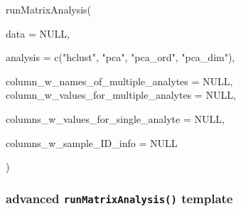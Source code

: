 \documentclass[
]{krantz}
\newenvironment{Shaded}{\begin{snugshade}}{\end{snugshade}}
\newcommand{\AttributeTok}[1]{\textcolor[rgb]{0.77,0.63,0.00}{#1}}
\newcommand{\ConstantTok}[1]{\textcolor[rgb]{0.00,0.00,0.00}{#1}}
\newcommand{\FunctionTok}[1]{\textcolor[rgb]{0.00,0.00,0.00}{#1}}
\newcommand{\NormalTok}[1]{#1}
\newcommand{\StringTok}[1]{\textcolor[rgb]{0.31,0.60,0.02}{#1}}
\begin{document}
\begin{Shaded}
\begin{Highlighting}[]

\FunctionTok{runMatrixAnalysis}\NormalTok{(}
                
  \AttributeTok{data =} \ConstantTok{NULL}\NormalTok{,}

  \AttributeTok{analysis =} \FunctionTok{c}\NormalTok{(}\StringTok{"hclust"}\NormalTok{, }\StringTok{"pca"}\NormalTok{, }\StringTok{"pca\_ord"}\NormalTok{, }\StringTok{"pca\_dim"}\NormalTok{),}

  \AttributeTok{column\_w\_names\_of\_multiple\_analytes =} \ConstantTok{NULL}\NormalTok{,}
  \AttributeTok{column\_w\_values\_for\_multiple\_analytes =} \ConstantTok{NULL}\NormalTok{,}
    
  \AttributeTok{columns\_w\_values\_for\_single\_analyte =} \ConstantTok{NULL}\NormalTok{,}

  \AttributeTok{columns\_w\_sample\_ID\_info =} \ConstantTok{NULL}

\NormalTok{)}
\end{Highlighting}
\end{Shaded}

\hypertarget{advanced-runmatrixanalysis-template}{%
\subsubsection{\texorpdfstring{advanced \texttt{runMatrixAnalysis()} template}{advanced runMatrixAnalysis() template}}\label{advanced-runmatrixanalysis-template}}
\end{document}
